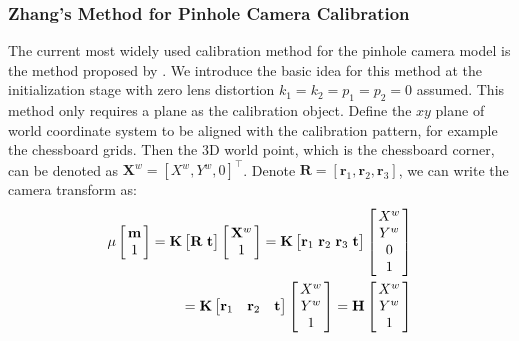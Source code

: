 \documentclass{report}
\begin{document}
\subsubsection{Zhang's Method for Pinhole Camera Calibration}
The current most widely used calibration method for the pinhole camera model is the method proposed by \cite{zhang2000flexible}. We introduce the basic idea for this method at the initialization stage with zero lens distortion $k_1 = k_2 = p_1 = p_2 = 0$ assumed. This method only requires a plane as the calibration object. Define the $xy$ plane of world coordinate system to be aligned with the calibration pattern, for example the chessboard grids. Then the 3D world point, which is the chessboard corner, can be denoted as $\mathbf{X}^w = [X^w, Y^w, 0]^\top$. Denote $\mathbf{R} = [\mathbf{r}_1, \mathbf{r}_2, \mathbf{r}_3]$, we can write the camera transform as: 
\begin{equation}
\begin{split}
\mu \arraycolsep=1.5pt%
\begin{bmatrix}
	\begin{array}{c}
	\mathbf{m} \\ 1
	\end{array}
\end{bmatrix} = \mathbf{K}
\begin{bmatrix}
\mathbf{R} & \mathbf{t}
\end{bmatrix}
\arraycolsep=1.5pt%
\begin{bmatrix}
	\begin{array}{c}
	\mathbf{X}^w \\ 1
	\end{array}
\end{bmatrix}
= \mathbf{K}
\begin{bmatrix}
\mathbf{r}_1 & \mathbf{r}_2 & \mathbf{r}_3 & \mathbf{t}
\end{bmatrix}
\arraycolsep=1.5pt%
\begin{bmatrix}
	\begin{array}{c}
	X^w \\ Y^w \\ 0 \\ 1
	\end{array}
\end{bmatrix}\\
= \mathbf{K}
\begin{bmatrix}
\mathbf{r}_1 & \mathbf{r}_2 & \mathbf{t}
\end{bmatrix}
\arraycolsep=1.5pt%
\begin{bmatrix}
	\begin{array}{c}
	X^w \\ Y^w \\ 1
	\end{array}
\end{bmatrix}
=\mathbf{H}
\arraycolsep=1.5pt%
\begin{bmatrix}
	\begin{array}{c}
	X^w \\ Y^w \\ 1
	\end{array}
\end{bmatrix}
\end{split}
\end{equation}
\end{document}
